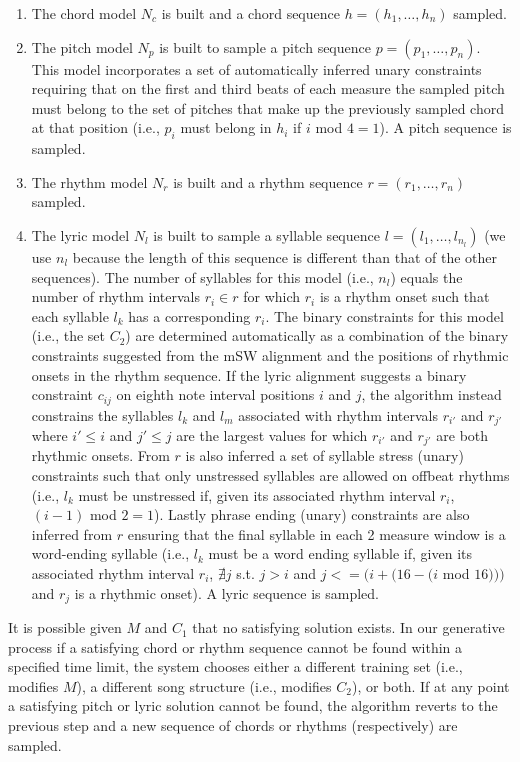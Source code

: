 \documentclass[phd,electronic,oneside,twosidetoc,letterpaper,chaptercenter,parttop,lol,lof,lot]{byumsphd}
\begin{document}
\begin{enumerate}
\item The chord model $N_c$ is built and a chord sequence $h=(h_1,\dots,h_n)$ sampled.
\item The pitch model $N_p$ is built to sample a pitch sequence $p=(p_1,\dots,p_n)$. This model incorporates a set of automatically inferred unary constraints requiring that on the first and third beats of each measure the sampled pitch must belong to the set of pitches that make up the previously sampled chord at that position (i.e., $p_i$ must belong in $h_i$ if $i$ mod $4 = 1$). A pitch sequence is sampled.
\item The rhythm model $N_r$ is built and a rhythm sequence $r=(r_1,\dots,r_n)$ sampled.
\item The lyric model $N_l$ is built to sample a syllable sequence $l=(l_1,\dots,l_{n_l})$ (we use $n_l$ because the length of this sequence is different than that of the other sequences). The number of syllables for this model (i.e., $n_l$) equals the number of rhythm intervals $r_i\in r$ for which $r_i$ is a rhythm onset such that each syllable $l_k$ has a corresponding $r_i$. The binary constraints for this model (i.e., the set $C_2$) are determined automatically as a combination of the binary constraints suggested from the mSW alignment and the positions of rhythmic onsets in the rhythm sequence. If the lyric alignment suggests a binary constraint $c_{ij}$ on eighth note interval positions $i$ and $j$, the algorithm instead constrains the syllables $l_k$ and $l_m$ associated with rhythm intervals $r_{i'}$ and $r_{j'}$ where $i'\le i$ and $j'\le j$ are the largest values for which $r_{i'}$ and $r_{j'}$ are both rhythmic onsets. From $r$ is also inferred a set of syllable stress (unary) constraints such that only unstressed syllables are allowed on offbeat rhythms (i.e., $l_k$ must be unstressed if, given its associated rhythm interval $r_i$, $(i-1)$ mod $2 = 1$). Lastly phrase ending (unary) constraints are also inferred from $r$ ensuring that the final syllable in each 2 measure window is a word-ending syllable (i.e., $l_k$ must be a word ending syllable if, given its associated rhythm interval $r_i$, $\nexists j$ s.t. $j > i$ and $j <= (i + (16-(i$ mod $16)))$ and $r_j$ is a rhythmic onset). A lyric sequence is sampled.
\end{enumerate}

\noindent It is possible given ${M}$ and ${C_1}$ that no satisfying solution exists. In our generative process if a satisfying chord or rhythm sequence cannot be found within a specified time limit, the system chooses either a different training set (i.e., modifies ${M}$), a different song structure (i.e., modifies ${C_2}$), or both. If at any point a satisfying pitch or lyric solution cannot be found, the algorithm reverts to the previous step and a new sequence of chords or rhythms (respectively) are sampled.
\end{document}
